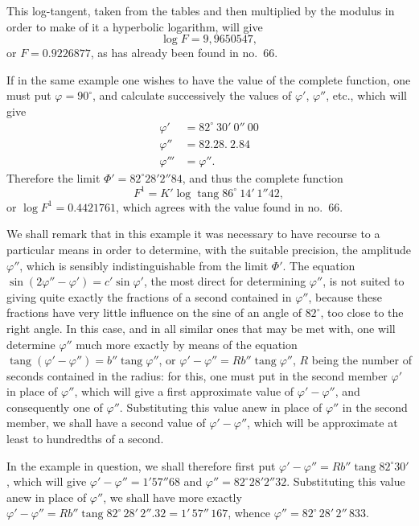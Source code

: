 \documentclass{article}
\begin{document}
This log-tangent, taken from the tables and then multiplied by the modulus in order to make of it a hyperbolic logarithm, will give
\[ \log F=9{,}9650547, \]
or $F=0.9226877$, as has already been found in no.~66.

If in the same example one wishes to have the value of the complete function, one must put $\varphi=90^{\circ}$, and calculate successively the values of $\varphi'$, $\varphi''$, etc., which will give
\[ \begin{aligned} \varphi'&=82^{\circ}\ 30'\ 0''\ 00\\ \varphi''&=82.28.\ 2.84\\ \varphi'''&=\varphi''. \end{aligned} \]
Therefore the limit $\Phi'=82^{\circ}28'2''84$, and thus the complete function
\[ F^{1}=K'\log\operatorname{tang}86^{\circ}\ 14'\ 1''42, \]
or $\log F^{1}=0.4421761$, which agrees with the value found in no.~66.

We shall remark that in this example it was necessary to have recourse to a particular means in order to determine, with the suitable precision, the amplitude $\varphi''$, which is sensibly indistinguishable from the limit $\Phi'$. The equation $\sin(2\varphi''-\varphi')=c'\sin\varphi'$, the most direct for determining $\varphi''$, is not suited to giving quite exactly the fractions of a second contained in $\varphi''$, because these fractions have very little influence on the sine of an angle of $82^{\circ}$, too close to the right angle. In this case, and in all similar ones that may be met with, one will determine $\varphi''$ much more exactly by means of the equation $\operatorname{tang}(\varphi'-\varphi'')=b''\operatorname{tang}\varphi''$, or $\varphi'-\varphi''=Rb''\operatorname{tang}\varphi''$, $R$ being the number of seconds contained in the radius: for this, one must put in the second member $\varphi'$ in place of $\varphi''$, which will give a first approximate value of $\varphi'-\varphi''$, and consequently one of $\varphi''$. Substituting this value anew in place of $\varphi''$ in the second member, we shall have a second value of $\varphi'-\varphi''$, which will be approximate at least to hundredths of a second.

In the example in question, we shall therefore first put $\varphi'-\varphi''=Rb''\operatorname{tang}82^{\circ}30'$, which will give $\varphi'-\varphi''=1'57''68$ and $\varphi''=82^{\circ}28'2''32$. Substituting this value anew in place of $\varphi''$, we shall have more exactly $\varphi'-\varphi''=Rb''\operatorname{tang}82^{\circ}\,28'\,2''.32=1'\,57''\,167$, whence $\varphi''=82^{\circ}\,28'\,2''\,833$.
\end{document}
